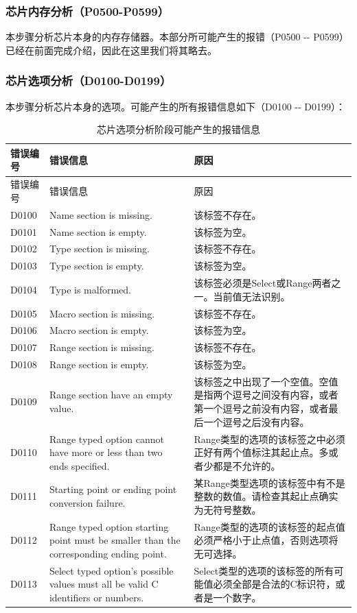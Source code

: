 \subsubsection{芯片内存分析（P0500-P0599）}\label{subsubsec:5-6-3-2}

本步骤分析芯片本身的内存存储器。本部分所可能产生的报错（P0500 -\/-
P0599）已经在前面完成介绍，因此在这里我们将其略去。

\subsubsection{芯片选项分析（D0100-D0199）}\label{subsubsec:5-6-3-3}

本步骤分析芯片本身的选项。可能产生的所有报错信息如下（D0100 -\/-
D0199）：

\begin{xltabular}{\textwidth}{@{}>{\hsize\raggedright\arraybackslash}X>{\hsize\raggedright\arraybackslash}X>{\hsize\raggedright\arraybackslash}X@{}}
\caption{芯片选项分析阶段可能产生的报错信息}\label{tab:5-18}\\
\toprule
错误编号 & 错误信息 & 原因\tabularnewline
\endfirsthead
\toprule
错误编号 & 错误信息 & 原因\tabularnewline
\midrule
\endhead
\bottomrule
\endlastfoot
D0100 & Name section is missing. & 该标签不存在。\tabularnewline
D0101 & Name section is empty. & 该标签为空。\tabularnewline
D0102 & Type section is missing. & 该标签不存在。\tabularnewline
D0103 & Type section is empty. & 该标签为空。\tabularnewline
D0104 & Type is malformed. & 该标签必须是Select或Range两者之一。当前值无法识别。\tabularnewline
D0105 & Macro section is missing. & 该标签不存在。\tabularnewline
D0106 & Macro section is empty. & 该标签为空。\tabularnewline
D0107 & Range section is missing. & 该标签不存在。\tabularnewline
D0108 & Range section is empty. & 该标签为空。\tabularnewline
D0109 & Range section have an empty value. & 该标签之中出现了一个空值。空值是指两个逗号之间没有内容，或者第一个逗号之前没有内容，或者最后一个逗号之后没有内容。\tabularnewline
D0110 & Range typed option cannot have more or less than two ends
specified. & Range类型的选项的该标签之中必须正好有两个值标注其起止点。多或者少都是不允许的。\tabularnewline
D0111 & Starting point or ending point conversion failure. &
某Range类型选项的该标签中有不是整数的数值。请检查其起止点确实为无符号整数。\tabularnewline
D0112 & Range typed option starting point must be smaller than the
corresponding ending point. & Range类型的选项的该标签的起点值必须严格小于止点值，否则选项将无可选择。\tabularnewline
D0113 & Select typed option's possible values must all be valid C
identifiers or numbers. & Select类型的选项的该标签的所有可能值必须全部是合法的C标识符，或者是一个数字。\tabularnewline
\end{xltabular}

